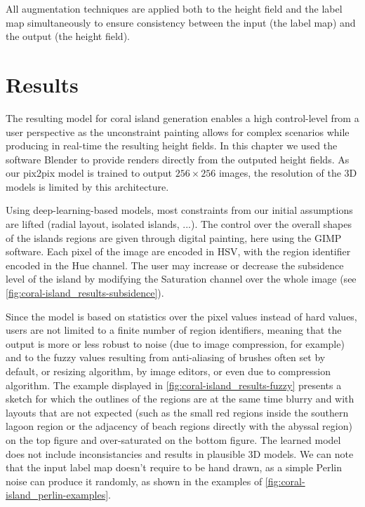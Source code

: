 \documentclass{egpubl}
\begin{document}
All augmentation techniques are applied both to the height field and the label map simultaneously to ensure consistency between the input (the label map) and the output (the height field).







\section{Results}

The resulting model for coral island generation enables a high control-level from a user perspective as the unconstraint painting allows for complex scenarios while producing in real-time the resulting height fields. In this chapter we used the software Blender to provide renders directly from the outputed height fields. As our pix2pix model is trained to output $256\times256$ images, the resolution of the 3D models is limited by this architecture.


Using deep-learning-based models, most constraints from our initial assumptions are lifted (radial layout, isolated islands, ...). The control over the overall shapes of the islands regions are given through digital painting, here using the GIMP software. Each pixel of the image are encoded in HSV, with the region identifier encoded in the Hue channel. The user may increase or decrease the subsidence level of the island by modifying the Saturation channel over the whole image (see \cref{fig:coral-island_results-subsidence}). 

Since the model is based on statistics over the pixel values instead of hard values, users are not limited to a finite number of region identifiers, meaning that the output is more or less robust to noise (due to image compression, for example) and to the fuzzy values resulting from anti-aliasing of brushes often set by default, or resizing algorithm, by image editors, or even due to compression algorithm. The example displayed in \cref{fig:coral-island_results-fuzzy} presents a sketch for which the outlines of the regions are at the same time blurry and with layouts that are not expected (such as the small red regions inside the southern lagoon region or the adjacency of beach regions directly with the abyssal region) on the top figure and over-saturated on the bottom figure. The learned model does not include inconsistancies and results in plausible 3D models. We can note that the input label map doesn't require to be hand drawn, as a simple Perlin noise can produce it randomly, as shown in the examples of \cref{fig:coral-island_perlin-examples}.
\end{document}
